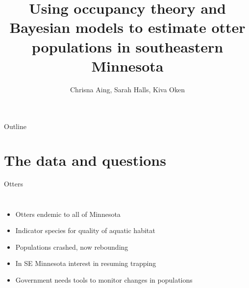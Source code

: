 \documentclass{beamer}
\title{Using occupancy theory and Bayesian models to estimate otter populations
in southeastern Minnesota}
\author[Aing, Halls, Oken]{Chrisna Aing, Sarah Halls, Kiva Oken}
\institute{Carleton College}
\begin{document}
{
	\begin{frame}
		\titlepage
	\end{frame}
}

\begin{frame}{Outline}
		\tableofcontents[pausesections]
\end{frame}

\section{The data and questions}
\begin{frame}{Otters}
	\begin{columns}
		\column{5cm}
		\begin{itemize}[<+->]
			\item Otters endemic to all of Minnesota
			\item Indicator species for quality of aquatic habitat
			\item Populations crashed, now rebounding
			\item In SE Minnesota interest in resuming trapping
			\item Government needs tools to monitor changes in populations
		\end{itemize}
		\column{5cm}
	\end{columns}
\end{frame}
\end{document}
